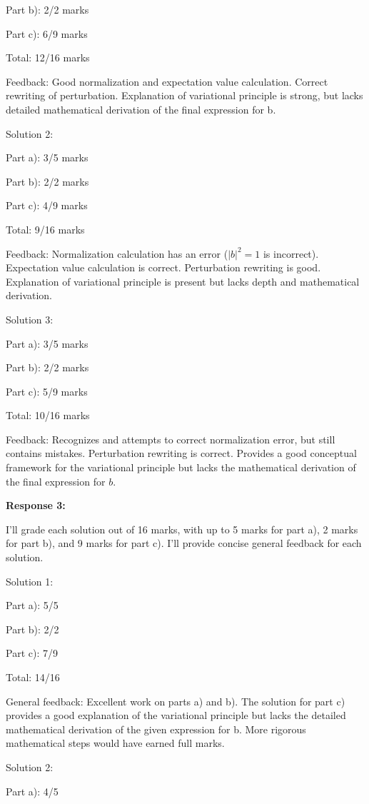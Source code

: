 \documentclass[a4paper,11pt]{article}
\begin{document}
Part b): 2/2 marks

Part c): 6/9 marks

Total: 12/16 marks

Feedback: Good normalization and expectation value calculation. Correct rewriting of perturbation. Explanation of variational principle is strong, but lacks detailed mathematical derivation of the final expression for b.

Solution 2:

Part a): 3/5 marks

Part b): 2/2 marks

Part c): 4/9 marks

Total: 9/16 marks

Feedback: Normalization calculation has an error (\(|b|^2 = 1\) is incorrect). Expectation value calculation is correct. Perturbation rewriting is good. Explanation of variational principle is present but lacks depth and mathematical derivation.

Solution 3:

Part a): 3/5 marks

Part b): 2/2 marks

Part c): 5/9 marks

Total: 10/16 marks

Feedback: Recognizes and attempts to correct normalization error, but still contains mistakes. Perturbation rewriting is correct. Provides a good conceptual framework for the variational principle but lacks the mathematical derivation of the final expression for \(b\).

\bigskip
\textbf{Response 3:}

I'll grade each solution out of 16 marks, with up to 5 marks for part a), 2 marks for part b), and 9 marks for part c). I'll provide concise general feedback for each solution.

Solution 1:

Part a): 5/5

Part b): 2/2

Part c): 7/9

Total: 14/16

General feedback: Excellent work on parts a) and b). The solution for part c) provides a good explanation of the variational principle but lacks the detailed mathematical derivation of the given expression for b. More rigorous mathematical steps would have earned full marks.

Solution 2:

Part a): 4/5
\end{document}
